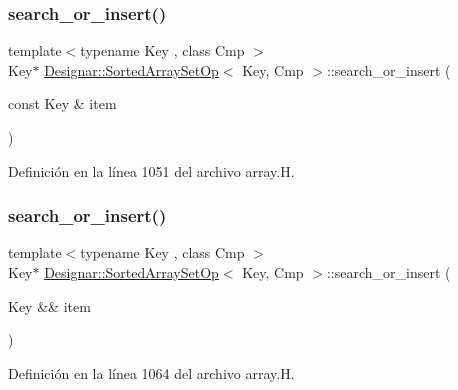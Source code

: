\subsubsection{\texorpdfstring{search\+\_\+or\+\_\+insert()}{search\_or\_insert()}\hspace{0.1cm}{\footnotesize\ttfamily [1/2]}}
{\footnotesize\ttfamily template$<$typename Key , class Cmp $>$ \\
Key$\ast$ \hyperlink{class_designar_1_1_sorted_array_set_op}{Designar\+::\+Sorted\+Array\+Set\+Op}$<$ Key, Cmp $>$\+::search\+\_\+or\+\_\+insert (\begin{DoxyParamCaption}\item[{const Key \&}]{item }\end{DoxyParamCaption})\hspace{0.3cm}{\ttfamily [inline]}}



Definición en la línea 1051 del archivo array.\+H.

\mbox{\label{class_designar_1_1_sorted_array_set_op_ad0299c41514cf11f5a418b9e46994580}} 
\subsubsection{\texorpdfstring{search\+\_\+or\+\_\+insert()}{search\_or\_insert()}\hspace{0.1cm}{\footnotesize\ttfamily [2/2]}}
{\footnotesize\ttfamily template$<$typename Key , class Cmp $>$ \\
Key$\ast$ \hyperlink{class_designar_1_1_sorted_array_set_op}{Designar\+::\+Sorted\+Array\+Set\+Op}$<$ Key, Cmp $>$\+::search\+\_\+or\+\_\+insert (\begin{DoxyParamCaption}\item[{Key \&\&}]{item }\end{DoxyParamCaption})\hspace{0.3cm}{\ttfamily [inline]}}



Definición en la línea 1064 del archivo array.\+H.

\mbox{\label{class_designar_1_1_sorted_array_set_op_ad08d29cf21ed0afa0e59ab86fb171108}} 
